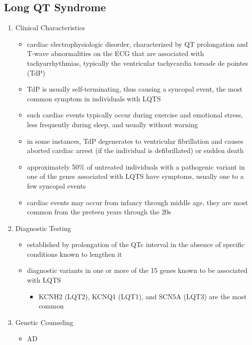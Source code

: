 \documentclass[12pt]{scrartcl}
\begin{document}
\subsection{Long QT Syndrome}
\label{sec:org7f9979b}
\begin{enumerate}
\item Clinical Characteristics
\label{sec:org0d63559}
\begin{itemize}
\item cardiac electrophysiologic disorder, characterized by QT
prolongation and T-wave abnormalities on the ECG that are associated
with tachyarrhythmias, typically the ventricular tachycardia torsade
de pointes (TdP)
\item TdP is usually self-terminating, thus causing a syncopal event, the
most common symptom in individuals with LQTS
\item such cardiac events typically occur during exercise and emotional
stress, less frequently during sleep, and usually without warning
\item in some instances, TdP degenerates to ventricular fibrillation and
causes aborted cardiac arrest (if the individual is defibrillated)
or sudden death
\item approximately 50\% of untreated individuals with a pathogenic variant
in one of the genes associated with LQTS have symptoms, usually one
to a few syncopal events
\item cardiac events may occur from infancy through middle age, they are
most common from the preteen years through the 20s
\end{itemize}
\item Diagnostic Testing
\label{sec:orgf78bc87}
\begin{itemize}
\item established by prolongation of the QTc interval in the absence of
specific conditions known to lengthen it
\item diagnostic variants in one or more of the 15 genes known to be
associated with LQTS
\begin{itemize}
\item KCNH2 (LQT2), KCNQ1 (LQT1), and SCN5A (LQT3) are the most common
\end{itemize}
\end{itemize}
\item Genetic Counseling
\label{sec:org0332ed4}
\begin{itemize}
\item AD
\end{itemize}
\end{enumerate}
\end{document}
